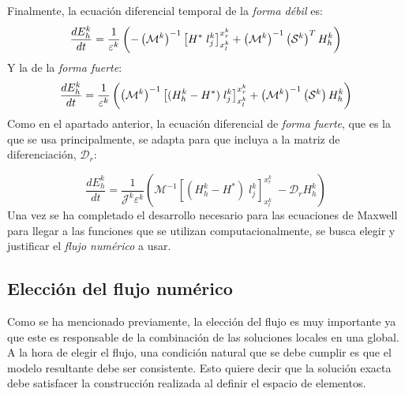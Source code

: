 \documentclass[11pt,a4paper,twoside,pdf]{article}
\numberwithin{equation}{section}
\begin{document}
Finalmente, la ecuación diferencial temporal de la \textit{forma débil} es:
\begin{equation}
    \frac{dE_h^k}{dt}=\frac{1}{\varepsilon^k}\left(-\left( \mathcal{M}^k \right)^{-1}\left[H^*\;l_j^k\right]^{x^k_r}_{x^k_l}+\left( \mathcal{M}^k \right)^{-1}\left(\mathcal{S}^k\right)^TH_h^k\right)\notag
\end{equation}
Y la de la \textit{forma fuerte}:
\begin{equation}
\begin{split}
\frac{dE_h^k}{dt} = \frac{1}{\varepsilon^k}\left(\left( \mathcal{M}^k \right)^{-1}  \left[(H^k_h-H^*)\;l_j^k\right]^{x^k_r}_{x^k_l} 
  +\left( \mathcal{M}^k \right)^{-1} \left(\mathcal{S}^k\right) H_h^k\right)
\end{split}\notag
\end{equation}
Como en el apartado anterior, la ecuación diferencial de \textit{forma fuerte}, que es la que se usa principalmente, se adapta para que incluya a la matriz de diferenciación, $\mathcal{D}_r$:
\begin{comment}

\begin{equation}
       \frac{dH_h^k}{dt}=\frac{1}{J^k\mu^k}\left(-\mathcal{M}^{-1}\left[l^k(x)E^*\right]^{x_r^k}_{x_l^k}\;-\mathcal{D}_rE^k_h\right)\notag \notag
\end{equation}

Y siguiendo con la \textit{forma fuerte}:
    
\end{comment}
\begin{equation}
    \frac{dE_h^k}{dt}=\frac{1}{\mathcal{J}^k\varepsilon^k}\left(\mathcal{M}^{-1}\left[(H^k_h-H^*)\;l_j^k\right]^{x_r^k}_{x_l^k}\;-\mathcal{D}_rH^k_h\right)
    \label{eqdE}
\end{equation}
Una vez se ha completado el desarrollo necesario para las ecuaciones de Maxwell para llegar a las funciones que se utilizan computacionalmente, se busca elegir y justificar el \textit{flujo numérico} a usar.
\subsection{Elección del flujo numérico}
Como se ha mencionado previamente, la elección del flujo es muy importante ya que este es responsable de la combinación de las soluciones locales en una global. A la hora de elegir el flujo, una condición natural que se debe cumplir es que el modelo resultante debe ser consistente. Esto quiere decir que la solución exacta debe satisfacer la construcción realizada al definir el espacio de elementos.
\end{document}
